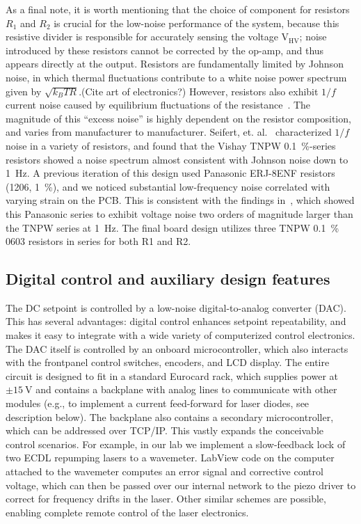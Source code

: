 \documentclass[aip,rsi,reprint]{revtex4-1} %
\begin{document}
As a final note, it is worth mentioning that the choice of component for resistors $R_1$ and $R_2$ is crucial for the low-noise performance of the system, because this resistive divider is responsible for accurately sensing the voltage $\text{V}_\text{HV}$; noise introduced by these resistors cannot be corrected by the op-amp, and thus appears directly at the output.
Resistors are fundamentally limited by Johnson noise, in which thermal fluctuations contribute to a white noise power spectrum given by $\sqrt{k_B T R}$.(Cite art of electronics?)\cite{Horowitz1989a}
However, resistors also exhibit $1/f$ current noise caused by equilibrium fluctuations of the resistance~\cite{Clarke1974a,Voss1976a}.
The magnitude of this ``excess noise'' is highly dependent on the resistor composition, and varies from manufacturer to manufacturer.
Seifert, et. al.~\cite{Seifert2009a} characterized $1/f$ noise in a variety of resistors, and found that the Vishay TNPW \SI{0.1}{\percent}-series resistors showed a noise spectrum almost consistent with Johnson noise down to \SI{1}{\hertz}.
A previous iteration of this design used Panasonic ERJ-8ENF resistors (1206, \SI{1}{\percent}), and we noticed substantial low-frequency noise correlated with varying strain on the PCB.
This is consistent with the findings in~\cite{Seifert2009a}, which showed this Panasonic series to exhibit voltage noise two orders of magnitude larger than the TNPW series at \SI{1}{\hertz}.
The final board design utilizes three TNPW \SI{0.1}{\percent} 0603 resistors in series for both R1 and R2.

\subsection{Digital control and auxiliary design features}
\label{Sec:DigControlAuxDesign}

The DC setpoint is controlled by a low-noise digital-to-analog converter (DAC).
This has several advantages: digital control enhances setpoint repeatability, and makes it easy to integrate with a wide variety of computerized control electronics.
The DAC itself is controlled by an onboard microcontroller, which also interacts with the frontpanel control switches, encoders, and LCD display.
The entire circuit is designed to fit in a standard Eurocard rack, which supplies power at $\pm\SI{15}{\volt}$ and contains a backplane with analog lines to communicate with other modules (e.g., to implement a current feed-forward for laser diodes, see description below).
The backplane also contains a secondary microcontroller, which can be addressed over TCP/IP.
This vastly expands the conceivable control scenarios. For example, in our lab we implement a slow-feedback lock of two ECDL repumping lasers to a wavemeter.
LabView code on the computer attached to the wavemeter computes an error signal and corrective control voltage, which can then be passed over our internal network to the piezo driver to correct for frequency drifts in the laser.
Other similar schemes are possible, enabling complete remote control of the laser electronics.
\end{document}
